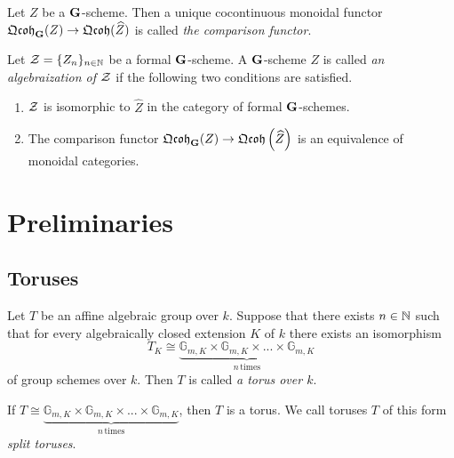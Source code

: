 \begin{definition}
Let $Z$ be a $\mathbf{G}$-scheme. Then a unique cocontinuous monoidal functor $\mathfrak{Qcoh}_{\mathbf{G}}(Z)\rightarrow \mathfrak{Qcoh}(\widehat{Z})$ is called \textit{the comparison functor}.
\end{definition}

\begin{definition}
Let ${\mathcal Z} = \{Z_n\}_{n\in \mathbb{N}}$ be a formal $\mathbf{G}$-scheme. A $\mathbf{G}$-scheme $Z$ is called \textit{an algebraization of ${\mathcal Z}$} if the following two conditions are satisfied.
\begin{enumerate}[label=\textbf{(\arabic*)}, leftmargin=1.5em]
\item ${\mathcal Z}$ is isomorphic to $\widehat{Z}$ in the category of formal $\mathbf{G}$-schemes.
\item The comparison functor $\mathfrak{Qcoh}_{\mathbf{G}}(Z)\rightarrow \mathfrak{Qcoh}\left(\widehat{Z}\right)$ is an equivalence of monoidal categories.
\end{enumerate}
\end{definition}

\section{Preliminaries}
\subsection{Toruses}

\begin{definition}
Let $T$ be an affine algebraic group over $k$. Suppose that there exists $n\in {\mathbb N}$ such that for every algebraically closed extension $K$ of $k$ there exists an isomorphism
$$T_K \cong  \underbrace{\mathbb{G}_{m,K}\times \mathbb{G}_{m,K}\times ...\times \mathbb{G}_{m,K}}_{n\,\mathrm{times}} $$
of group schemes over $k$. Then $T$ is called \textit{a torus over $k$}.
\end{definition}

\begin{example}\label{example:split_torus}
If $T \cong \underbrace{\mathbb{G}_{m,K}\times \mathbb{G}_{m,K}\times ...\times \mathbb{G}_{m,K}}_{n\,\mathrm{times}}$, then $T$ is a torus. We call toruses $T$ of this form \textit{split toruses}.
\end{example}

